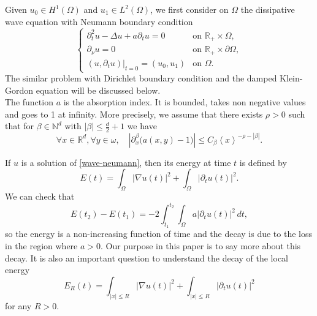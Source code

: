 \documentclass[10pt, a4paper,reqno]{amsart}
\theoremstyle{plain}
\theoremstyle{definition}
\theoremstyle{remark}
\begin{document}
Given $u_0 \in H^1({\Omega})$ and $u_1 \in L^2({\Omega})$, we first consider on ${\Omega}$ the dissipative wave equation with Neumann boundary condition
\begin{equation} \label{wave-neumann} 
\begin{cases}
\partial_t^2 u  -{\Delta} u + a \partial_t u = 0  & \text{on  }  {\mathbb{R}}_+ \times {\Omega}, \\
\partial_{\nu} u = 0 & \text{on } {\mathbb{R}}_+ \times \partial {\Omega},\\
{\left.{(u , \partial_t u )}\right|_{{t = 0}}} = (u_0, u_1) &  \text{on } {\Omega}.
\end{cases}
\end{equation}
The similar problem with Dirichlet boundary condition and the damped Klein-Gordon equation will be discussed below.\\

The function $a$ is the absorption index. It is bounded, takes non negative values and goes to 1 at infinity. More precisely, we assume that there exists $\rho > 0$ such that for ${\beta} \in {\mathbb{N}}^d$ with ${\left\vert {\beta}\right\vert} {\leqslant} \frac d 2 + 1$ we have
\begin{equation} \label{hyp-amort-inf}
\forall x \in {\mathbb{R}}^d, \forall y \in {\omega}, \quad {\left\vert {\partial_x^{\beta} \big(a(x,y)-1\big)}\right\vert} {\leqslant} C_{\beta} {\left< x \right>}^{-\rho-{\left\vert {\beta}\right\vert}}.
\end{equation}

If $u$ is a solution of \eqref{wave-neumann}, then its energy at time $t$ is defined by 
\begin{equation} \label{def-E}
E(t) =  \int_{\Omega}  {\left\vert {\nabla u (t)}\right\vert}^2  + \int_{\Omega} {\left\vert {\partial_t u (t)}\right\vert}^2.
\end{equation}
We can check that
\[
E(t_2) - E(t_1) = -2 \int_{t_1}^{t_2} \int_{\Omega} a {\left\vert {\partial_t u(t)}\right\vert}^2 \, dt,
\]
so the energy is a non-increasing function of time and the decay is due to the loss in the region where $a > 0$. Our purpose in this paper is to say more about this decay. It is also an important question to understand the decay of the local energy 
\[
E_R(t) = \int_{{\left\vert x\right\vert} {\leqslant} R}  {\left\vert {\nabla u (t)}\right\vert}^2  + \int_{{\left\vert x\right\vert} {\leqslant} R}  {\left\vert {\partial_t u (t)}\right\vert}^2
\]
for any $R > 0$.\\
\end{document}
